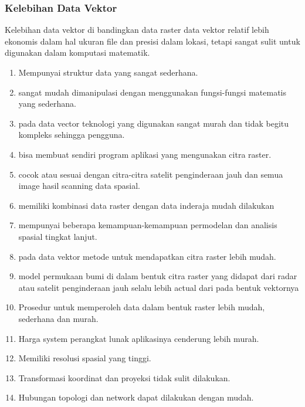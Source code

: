 \subsubsection{Kelebihan Data Vektor}
Kelebihan data vektor di bandingkan data raster
data vektor relatif lebih ekonomis dalam hal ukuran file dan presisi dalam lokasi, tetapi sangat sulit untuk digunakan dalam komputasi matematik. 
\begin{enumerate}
\item Mempunyai struktur data yang sangat sederhana.
\item sangat mudah dimanipulasi dengan menggunakan fungsi-fungsi matematis yang sederhana.
\item pada data vector teknologi yang digunakan sangat  murah dan tidak begitu kompleks sehingga pengguna.
\item bisa membuat sendiri program aplikasi yang mengunakan citra raster.
\item cocok atau sesuai dengan citra-citra satelit penginderaan jauh dan semua image hasil scanning data spasial.
\item  memiliki kombinasi data raster dengan data inderaja mudah dilakukan
\item mempunyai beberapa kemampuan-kemampuan permodelan dan analisis spasial tingkat lanjut.
\item pada data vektor metode untuk mendapatkan citra raster lebih mudah.
\item model permukaan bumi di dalam bentuk citra raster yang didapat dari radar atau satelit penginderaan jauh selalu lebih actual dari pada bentuk vektornya
\item Prosedur untuk memperoleh data dalam bentuk raster lebih mudah, sederhana dan murah.
\item Harga system perangkat lunak aplikasinya cenderung lebih murah.
\item Memiliki resolusi spasial yang tinggi.
\item Transformasi koordinat dan proyeksi tidak sulit dilakukan.
\item Hubungan topologi dan network dapat dilakukan dengan mudah.
\end{enumerate}
